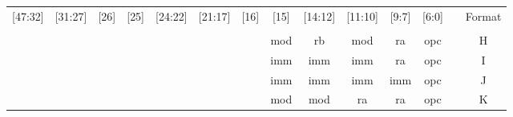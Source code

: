 
\begin{table}[hbt!]
\centering
\begin{tabular}{c|c|c|c|c|c|c|c|c|c|c|c|r|c|} 
\cline{1-12}\cline{14-14}
\multicolumn{1}{|c|}{{[}47:32]} & {[}31:27]            & {[}26]               & {[}25]               & {[}24:22]            & {[}21:17]            & {[}16]                & {[}15]               & {[}14:12]            & {[}11:10]            & {[}9:7]              & {[}6:0]              &                       & \multicolumn{1}{l|}{Format}  \\ 
\cline{1-12}\cline{14-14}
\multicolumn{1}{c}{}            & \multicolumn{1}{c}{} & \multicolumn{1}{c}{} & \multicolumn{1}{c}{} & \multicolumn{1}{c}{} & \multicolumn{1}{c}{} & \multicolumn{1}{c}{}  & \multicolumn{1}{c}{} & \multicolumn{1}{c}{} & \multicolumn{1}{c}{} & \multicolumn{1}{c}{} & \multicolumn{1}{c}{} & \multicolumn{1}{r}{}  & \multicolumn{1}{l}{}         \\ 
\cline{8-12}\cline{14-14}
\multicolumn{1}{c}{}            & \multicolumn{1}{c}{} & \multicolumn{1}{c}{} & \multicolumn{1}{c}{} & \multicolumn{1}{c}{} & \multicolumn{1}{c}{} &                       & mod                  & rb                   & mod                  & ra                   & opc                  &                       & H                            \\ 
\cline{8-12}\cline{14-14}
\multicolumn{1}{c}{}            & \multicolumn{1}{c}{} & \multicolumn{1}{c}{} & \multicolumn{1}{c}{} & \multicolumn{1}{c}{} & \multicolumn{1}{c}{} &                       & imm                  & imm                  & imm                  & ra                   & opc                  &                       & I                            \\ 
\cline{8-12}\cline{14-14}
\multicolumn{1}{c}{}            & \multicolumn{1}{c}{} & \multicolumn{1}{c}{} & \multicolumn{1}{c}{} & \multicolumn{1}{c}{} & \multicolumn{1}{c}{} &                       & imm                  & imm                  & imm                  & imm                  & opc                  &                       & J                            \\ 
\cline{8-12}\cline{14-14}
\multicolumn{1}{l}{}            & \multicolumn{1}{l}{} & \multicolumn{1}{l}{} & \multicolumn{1}{l}{} & \multicolumn{1}{l}{} & \multicolumn{1}{l}{} & \multicolumn{1}{l|}{} & mod                  & mod                  & ra                   & ra                   & opc                  & \multicolumn{1}{l|}{} & K                            \\ 

\end{tabular}
\end{table}
